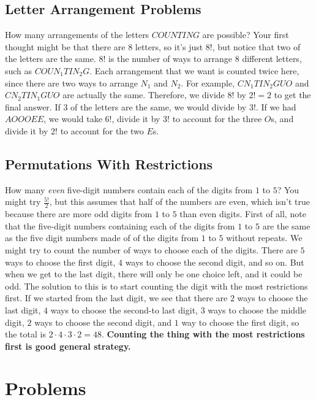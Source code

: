 \documentclass[twocolumn]{article}
\begin{document}
\subsection*{Letter Arrangement Problems}
How many arrangements of the letters $COUNTING$ are possible? Your first thought 
might be that there are $8$ letters, so it's just $8!$, but notice that two of 
the letters are the same. $8!$ is the number of ways to arrange $8$ different 
letters, such as $COUN_1 TIN_2 G$. Each arrangement that we want is counted 
twice here, since there are two ways to arrange $N_1$ and $N_2$. For example, 
$CN_1 TIN_2 GUO$ and $CN_2 TIN_1 GUO$ are actually the same. Therefore, we 
divide $8!$ by $2! = 2$ to get the final answer. If $3$ of the letters are the 
same, we would divide by $3!$. If we had $AOOOEE$, we would take $6!$, divide it 
by $3!$ to account for the three $O$s, and divide it by $2!$ to account for the 
two $E$s.

\subsection*{Permutations With Restrictions}
How many \emph{even} five-digit numbers contain each of the digits from $1$ to 
$5$? You might try $\frac{5!}{2}$, but this assumes that half of the numbers are 
even, which isn't true because there are more odd digits from $1$ to $5$ than 
even digits. First of all, note that the five-digit numbers containing each of 
the digits from $1$ to $5$ are the same as the five digit numbers made of of the 
digits from $1$ to $5$ without repeats. We might try to count the number of ways 
to choose each of the digits. There are $5$ ways to choose the first digit, $4$ 
ways to choose the second digit, and so on. But when we get to the last digit, 
there will only be one choice left, and it could be odd. The solution to this is 
to start counting the digit with the most restrictions first. If we started from 
the last digit, we see that there are $2$ ways to choose the last digit, $4$ 
ways to choose the second-to last digit, $3$ ways to choose the middle digit, 
$2$ ways to choose the second digit, and $1$ way to choose the first digit, so 
the total is $2 \cdot 4 \cdot 3 \cdot 2 = 48$. \textbf{Counting the thing with 
the most restrictions first is good general strategy.}

\section*{Problems}
\end{document}
